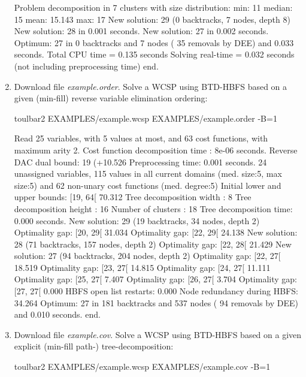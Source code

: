 \begin{enumerate}
{\begin{DoxyCode}
Problem decomposition in 7 clusters with size distribution: min: 11 median: 15 mean: 15.143 max: 17
New solution: 29 (0 backtracks, 7 nodes, depth 8)
New solution: 28 in 0.001 seconds.
New solution: 27 in 0.002 seconds.
Optimum: 27 in 0 backtracks and 7 nodes ( 35 removals by DEE) and 0.033 seconds.
Total CPU time = 0.135 seconds
Solving real-time = 0.032 seconds (not including preprocessing time)
end.
\end{DoxyCode}}
\item Download file {\em example.order}. Solve a WCSP using BTD-HBFS based on a given (min-fill) reverse variable elimination ordering:
\begin{DoxyCode}
	toulbar2 EXAMPLES/example.wcsp EXAMPLES/example.order -B=1
\end{DoxyCode}
{\scriptsize
\begin{DoxyCode}
Read 25 variables, with 5 values at most, and 63 cost functions, with maximum arity 2.
Cost function decomposition time : 8e-06 seconds.
Reverse DAC dual bound: 19 (+10.526%
Preprocessing time: 0.001 seconds.
24 unassigned variables, 115 values in all current domains (med. size:5, max size:5) and 62 non-unary cost functions (med. degree:5)
Initial lower and upper bounds: [19, 64[ 70.312%
Tree decomposition width  : 8
Tree decomposition height : 16
Number of clusters        : 18
Tree decomposition time: 0.000 seconds.
New solution: 29 (19 backtracks, 34 nodes, depth 2)
Optimality gap: [20, 29[ 31.034 %
Optimality gap: [22, 29[ 24.138 %
New solution: 28 (71 backtracks, 157 nodes, depth 2)
Optimality gap: [22, 28[ 21.429 %
New solution: 27 (94 backtracks, 204 nodes, depth 2)
Optimality gap: [22, 27[ 18.519 %
Optimality gap: [23, 27[ 14.815 %
Optimality gap: [24, 27[ 11.111 %
Optimality gap: [25, 27[ 7.407 %
Optimality gap: [26, 27[ 3.704 %
Optimality gap: [27, 27[ 0.000 %
HBFS open list restarts: 0.000 %
Node redundancy during HBFS: 34.264 %
Optimum: 27 in 181 backtracks and 537 nodes ( 94 removals by DEE) and 0.010 seconds.
end.
\end{DoxyCode}}
\item Download file {\em example.cov}. Solve a WCSP using BTD-HBFS based on a given explicit (min-fill path-) tree-decomposition:
\begin{DoxyCode}
	toulbar2 EXAMPLES/example.wcsp EXAMPLES/example.cov -B=1

\end{DoxyCode}
\end{enumerate}
